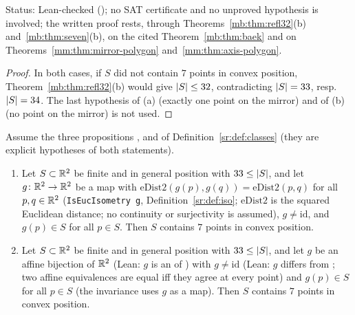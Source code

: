 Status: Lean-checked (); no SAT certificate and no unproved hypothesis is involved; the
written proof rests, through Theorems~\ref{mb:thm:refl32}(b) and~\ref{mb:thm:seven}(b), on the cited
Theorem~\ref{mb:thm:baek} and on Theorems~\ref{mm:thm:mirror-polygon} and~\ref{mm:thm:axis-polygon}.

\begin{proof}
In both cases, if $S$ did not contain $7$ points in convex position, Theorem~\ref{mb:thm:refl32}(b) would give
$\lvert S\rvert\le32$, contradicting $\lvert S\rvert=33$, resp.\ $\lvert S\rvert=34$. The last hypothesis of (a) (exactly one point on the
mirror) and of (b) (no point on the mirror) is not used.
\end{proof}

\begin{theorem}\label{mb:thm:main3}\raggedright
Assume the three propositions ,  and  of
Definition~\ref{sr:def:classes} (they are explicit hypotheses of both statements).
\begin{enumerate}[label=(\alph*)]
\item Let $S\subset\mathbb R^2$ be finite and in general position with $33\le\lvert S\rvert$, and let $g\colon\mathbb R^2\to\mathbb R^2$ be a map
  with $\mathrm{eDist2}(g(p),g(q))=\mathrm{eDist2}(p,q)$ for all $p,q\in\mathbb R^2$ (\texttt{IsEucIsometry g},
  Definition~\ref{sr:def:iso}; $\mathrm{eDist2}$ is the squared Euclidean distance; no continuity or surjectivity is
  assumed), $g\ne\mathrm{id}$, and $g(p)\in S$ for all $p\in S$. Then $S$ contains $7$ points in convex position.
\item Let $S\subset\mathbb R^2$ be finite and in general position with $33\le\lvert S\rvert$, and let $g$ be an affine bijection of
  $\mathbb R^2$ (Lean: $g$ is an  of ) with $g\ne\mathrm{id}$ (Lean: $g$ differs from
  ; two affine equivalences are equal iff they agree at every point) and $g(p)\in S$ for all
  $p\in S$ (the invariance uses $g$ as a map). Then $S$ contains $7$ points in convex position.
\end{enumerate}
\end{theorem}

